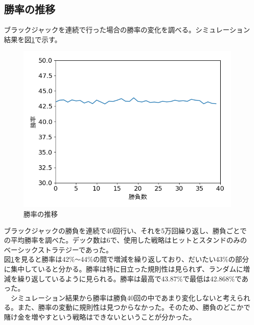 \subsection{勝率の推移}
ブラックジャックを連続で行った場合の勝率の変化を調べる。シミュレーション結果を図\ref{win}で示す。
\begin{figure}[H]
 \begin{center} 
  \includegraphics[width=0.7\linewidth]{./figure/betsimulation-win}
  \caption{勝率の推移\label{win}}
 \end{center}
\end{figure}
ブラックジャックの勝負を連続で40回行い、それを5万回繰り返し、勝負ごとでの平均勝率を調べた。デック数は6で、使用した戦略はヒットとスタンドのみのベーシックストラテジーであった。\\
図\ref{win}を見ると勝率は42\%\verb|～|44\%の間で増減を繰り返しており、だいたい43\%の部分に集中していると分かる。勝率は特に目立った規則性は見られず、ランダムに増減を繰り返しているように見られる。勝率は最高で43.87\%で最低は42.868\%であった。\\
　シミュレーション結果から勝率は勝負40回の中であまり変化しないと考えられる。また、勝率の変動に規則性は見つからなかった。そのため、勝負のどこかで賭け金を増やすという戦略はできないということが分かった。

